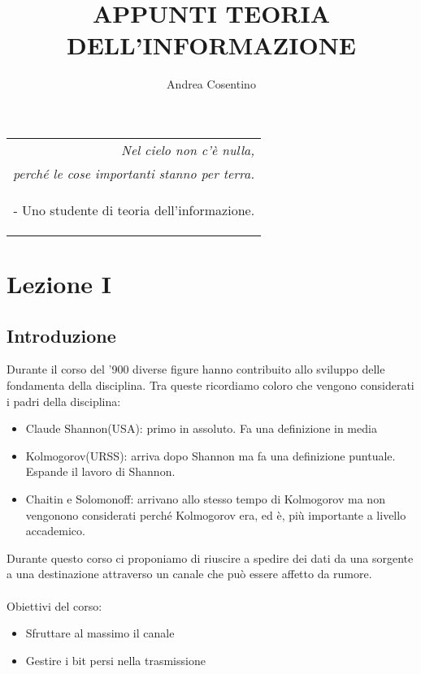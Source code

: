 \documentclass[12pt]{report}
\title{APPUNTI TEORIA DELL'INFORMAZIONE}
\author{Andrea Cosentino}
\def\blankpage{%
    \clearpage%
    \thispagestyle{empty}%
    \addtocounter{page}{-1}%
    \null%
    \clearpage}
\begin{document}
    \maketitle
    \tableofcontents

    \newpage
    \clearpage%
    \thispagestyle{empty}%
    \addtocounter{page}{-1}%
    \null%

    \begin{flushright}
        \begin{tabular}{r}
            \textit{Nel cielo non c'è nulla,}
            \\
            \textit{
                perché le cose importanti stanno per terra.}
            \\
            \begin{footnotesize}
                - Uno studente di teoria dell'informazione.
            \end{footnotesize}
        \end{tabular}
    \end{flushright}

    \clearpage
    \pagecolor{color}
    \blankpage
    \nopagecolor
    \chapter{Lezione I}
    \label{cap:Lezione I}
    \section{Introduzione}

    Durante il corso del '900 diverse figure hanno contribuito allo sviluppo delle fondamenta della disciplina. Tra queste ricordiamo coloro che vengono considerati i padri della disciplina:
    \begin{itemize}
        \item Claude Shannon(USA): primo in assoluto. Fa una definizione in media
        \item Kolmogorov(URSS): arriva dopo Shannon ma fa una definizione puntuale. Espande il lavoro di Shannon.
        \item Chaitin e Solomonoff: arrivano allo stesso tempo di Kolmogorov ma non vengonono considerati perché Kolmogorov era, ed è, più importante a livello accademico.
    \end{itemize}
    \vspace{10px}
    Durante questo corso ci proponiamo di riuscire a spedire dei dati da una sorgente a una destinazione
    attraverso un canale che può essere affetto da rumore.
    \\ \\
    Obiettivi del corso:
    \begin{itemize}
        \item{Sfruttare al massimo il canale}
        \item{Gestire i bit persi nella trasmissione}
    \end{itemize}
    \vspace{10px}
    \newpage
\end{document}
